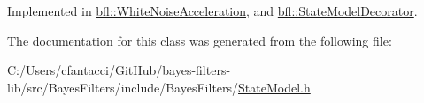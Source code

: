 Implemented in \mbox{\hyperlink{classbfl_1_1WhiteNoiseAcceleration_a0203b47074e0680852f53dcba8a7a627}{bfl\+::\+White\+Noise\+Acceleration}}, and \mbox{\hyperlink{classbfl_1_1StateModelDecorator_ad292f3b665c1adf20a1f32dc8a065fec}{bfl\+::\+State\+Model\+Decorator}}.



The documentation for this class was generated from the following file\+:\begin{DoxyCompactItemize}
\item 
C\+:/\+Users/cfantacci/\+Git\+Hub/bayes-\/filters-\/lib/src/\+Bayes\+Filters/include/\+Bayes\+Filters/\mbox{\hyperlink{StateModel_8h}{State\+Model.\+h}}\end{DoxyCompactItemize}
